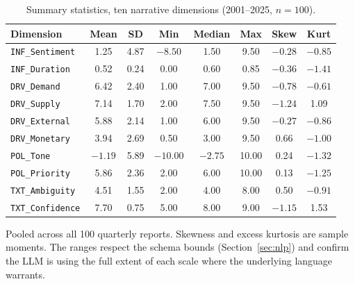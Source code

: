 \documentclass[AER]{AEA}
\begin{document}
\begin{table}[tbp]
\caption{Summary statistics, ten narrative dimensions (2001--2025, $n=100$).\label{tab:nlp_summary}}
\centering
\begin{tabular}{lccccccc}
\toprule
Dimension & Mean & SD & Min & Median & Max & Skew & Kurt \\
\midrule
\texttt{INF\_Sentiment}  & \phantom{$-$}1.25 & 4.87 & $-8.50$ & \phantom{$-$}1.50 & \phantom{$-$}9.50 & $-0.28$ & $-0.85$ \\
\texttt{INF\_Duration}   & \phantom{$-$}0.52 & 0.24 & \phantom{$-$}0.00 & \phantom{$-$}0.60 & \phantom{$-$}0.85 & $-0.36$ & $-1.41$ \\
\texttt{DRV\_Demand}     & \phantom{$-$}6.42 & 2.40 & \phantom{$-$}1.00 & \phantom{$-$}7.00 & \phantom{$-$}9.50 & $-0.78$ & $-0.61$ \\
\texttt{DRV\_Supply}     & \phantom{$-$}7.14 & 1.70 & \phantom{$-$}2.00 & \phantom{$-$}7.50 & \phantom{$-$}9.50 & $-1.24$ & \phantom{$-$}1.09 \\
\texttt{DRV\_External}   & \phantom{$-$}5.88 & 2.14 & \phantom{$-$}1.00 & \phantom{$-$}6.00 & \phantom{$-$}9.50 & $-0.27$ & $-0.86$ \\
\texttt{DRV\_Monetary}   & \phantom{$-$}3.94 & 2.69 & \phantom{$-$}0.50 & \phantom{$-$}3.00 & \phantom{$-$}9.50 & \phantom{$-$}0.66 & $-1.00$ \\
\texttt{POL\_Tone}       & $-1.19$ & 5.89 & $-10.00$ & $-2.75$ & \phantom{$-$}10.00 & \phantom{$-$}0.24 & $-1.32$ \\
\texttt{POL\_Priority}   & \phantom{$-$}5.86 & 2.36 & \phantom{$-$}2.00 & \phantom{$-$}6.00 & \phantom{$-$}10.00 & \phantom{$-$}0.13 & $-1.25$ \\
\texttt{TXT\_Ambiguity}  & \phantom{$-$}4.51 & 1.55 & \phantom{$-$}2.00 & \phantom{$-$}4.00 & \phantom{$-$}8.00 & \phantom{$-$}0.50 & $-0.91$ \\
\texttt{TXT\_Confidence} & \phantom{$-$}7.70 & 0.75 & \phantom{$-$}5.00 & \phantom{$-$}8.00 & \phantom{$-$}9.00 & $-1.15$ & \phantom{$-$}1.53 \\
\bottomrule
\end{tabular}
\begin{tablenotes}
Pooled across all 100 quarterly reports. Skewness and excess kurtosis are
sample moments. The ranges respect the schema bounds (Section~\ref{sec:nlp})
and confirm the LLM is using the full extent of each scale where the
underlying language warrants.
\end{tablenotes}
\end{table}
\end{document}
